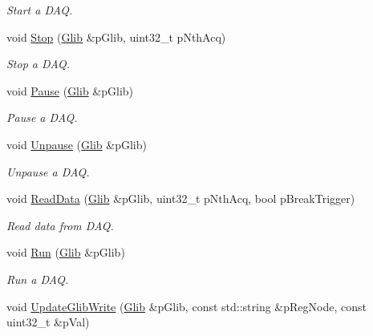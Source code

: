 \begin{DoxyCompactItemize}
\begin{DoxyCompactList}\small\item\em Start a D\-A\-Q. \end{DoxyCompactList}\item 
void \hyperlink{class_ph2___hw_interface_1_1_glib_interface_a3073d292371ab4e602900f4276a43b6c}{Stop} (\hyperlink{class_ph2___hw_description_1_1_glib}{Glib} \&p\-Glib, uint32\-\_\-t p\-Nth\-Acq)
\begin{DoxyCompactList}\small\item\em Stop a D\-A\-Q. \end{DoxyCompactList}\item 
void \hyperlink{class_ph2___hw_interface_1_1_glib_interface_a1db7815b60c3e3637b23bfa27bab9692}{Pause} (\hyperlink{class_ph2___hw_description_1_1_glib}{Glib} \&p\-Glib)
\begin{DoxyCompactList}\small\item\em Pause a D\-A\-Q. \end{DoxyCompactList}\item 
void \hyperlink{class_ph2___hw_interface_1_1_glib_interface_a4d6568c22d8e3777ee909db37b3b01d6}{Unpause} (\hyperlink{class_ph2___hw_description_1_1_glib}{Glib} \&p\-Glib)
\begin{DoxyCompactList}\small\item\em Unpause a D\-A\-Q. \end{DoxyCompactList}\item 
void \hyperlink{class_ph2___hw_interface_1_1_glib_interface_ad3f91f03b0214987f4a9e8b63ff99dca}{Read\-Data} (\hyperlink{class_ph2___hw_description_1_1_glib}{Glib} \&p\-Glib, uint32\-\_\-t p\-Nth\-Acq, bool p\-Break\-Trigger)
\begin{DoxyCompactList}\small\item\em Read data from D\-A\-Q. \end{DoxyCompactList}\item 
void \hyperlink{class_ph2___hw_interface_1_1_glib_interface_a116aca1863dda40c52ca63259cd073b9}{Run} (\hyperlink{class_ph2___hw_description_1_1_glib}{Glib} \&p\-Glib)
\begin{DoxyCompactList}\small\item\em Run a D\-A\-Q. \end{DoxyCompactList}\item 
void \hyperlink{class_ph2___hw_interface_1_1_glib_interface_afeda624fe12657712e9f10cd60603d8a}{Update\-Glib\-Write} (\hyperlink{class_ph2___hw_description_1_1_glib}{Glib} \&p\-Glib, const std\-::string \&p\-Reg\-Node, const uint32\-\_\-t \&p\-Val)

\end{DoxyCompactItemize}
